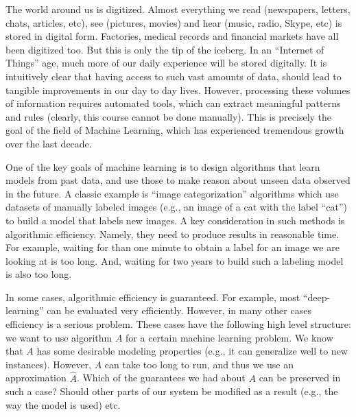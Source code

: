 The world around us is digitized.
Almost everything we read (newspapers, letters, chats, articles, etc), see (pictures, movies) and hear (music, radio, Skype, etc) is stored in digital form.
Factories, medical records and financial markets have all been digitized too.
But this is only the tip of the iceberg. In an ``Internet of Things'' age, much more of our daily experience will be stored digitally.  
It is intuitively clear that having access to such vast amounts of data, should lead to tangible improvements in our day to day lives. However, processing these volumes of information requires automated tools, which can extract meaningful patterns and rules (clearly, this course cannot be done manually). This is precisely the goal of the field of Machine Learning, which has experienced tremendous growth over the last decade.


One of the key goals of machine learning is to design algorithms that learn models from past data, and use those to make reason about unseen data observed in the future. A classic example is ``image categorization'' algorithms which use datasets of manually labeled images (e.g., an image of a cat with the label ``cat'') to build a model that labels new images. A key consideration in such methods is algorithmic efficiency. Namely, they need to produce results in reasonable time. For example, waiting for than one minute to obtain a label for an image we are looking at is too long. And, waiting for two years to build such a labeling model is also too long. 

In some cases, algorithmic efficiency is guaranteed. For example, most ``deep-learning'' can be evaluated very efficiently. However, in many other cases efficiency is a serious problem. These cases have the following high level structure: we want to use algorithm $A$ for a certain machine learning problem. We know that $A$ has some desirable modeling properties (e.g., it can generalize well to new instances). However, $A$ can take too long to run, and thus we use an approximation $\hat{A}$. Which of the guarantees we had about $A$ can be preserved in such a case? Should other parts of our system be modified as a result (e.g., the way the model is used) etc. 

